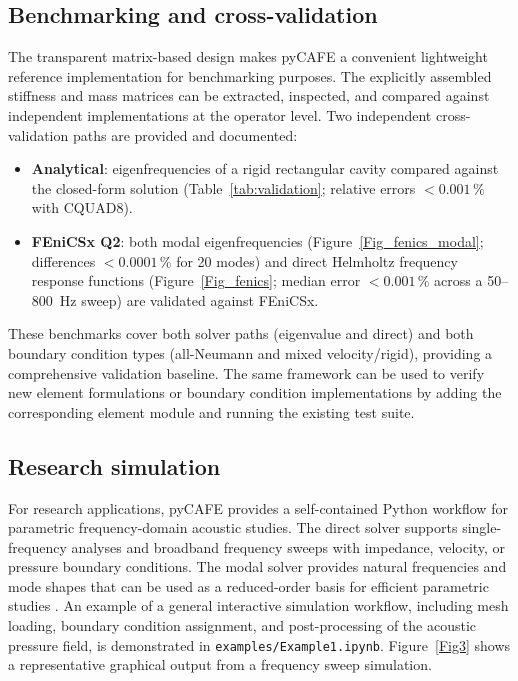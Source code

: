 \documentclass{jors}
\begin{document}
\subsection*{Benchmarking and cross-validation}

The transparent matrix-based design makes pyCAFE a convenient lightweight reference implementation for benchmarking purposes. The explicitly assembled stiffness and mass matrices can be extracted, inspected, and compared against independent implementations at the operator level. Two independent cross-validation paths are provided and documented:
\begin{itemize}
    \item \textbf{Analytical}: eigenfrequencies of a rigid rectangular cavity compared against the closed-form solution (Table~\ref{tab:validation}; relative errors $< 0.001\,\%$ with CQUAD8).
    \item \textbf{FEniCSx Q2}: both modal eigenfrequencies (Figure~\ref{Fig_fenics_modal}; differences $< 0.0001\,\%$ for 20 modes) and direct Helmholtz frequency response functions (Figure~\ref{Fig_fenics}; median error $< 0.001\,\%$ across a 50--800~Hz sweep) are validated against FEniCSx.
\end{itemize}
These benchmarks cover both solver paths (eigenvalue and direct) and both boundary condition types (all-Neumann and mixed velocity/rigid), providing a comprehensive validation baseline. The same framework can be used to verify new element formulations or boundary condition implementations by adding the corresponding element module and running the existing test suite.

\subsection*{Research simulation}

For research applications, pyCAFE provides a self-contained Python workflow for parametric frequency-domain acoustic studies. The direct solver supports single-frequency analyses and broadband frequency sweeps with impedance, velocity, or pressure boundary conditions. The modal solver provides natural frequencies and mode shapes that can be used as a reduced-order basis for efficient parametric studies \cite{Cai2024}. An example of a general interactive simulation workflow, including mesh loading, boundary condition assignment, and post-processing of the acoustic pressure field, is demonstrated in \texttt{examples/Example1.ipynb}. Figure~\ref{Fig3} shows a representative graphical output from a frequency sweep simulation.
\end{document}
